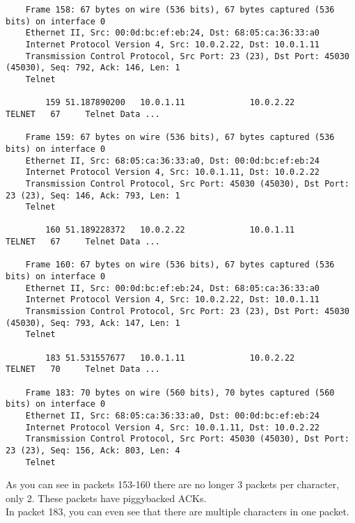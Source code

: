 \begin{verbatim}
	Frame 158: 67 bytes on wire (536 bits), 67 bytes captured (536 bits) on interface 0
	Ethernet II, Src: 00:0d:bc:ef:eb:24, Dst: 68:05:ca:36:33:a0
	Internet Protocol Version 4, Src: 10.0.2.22, Dst: 10.0.1.11
	Transmission Control Protocol, Src Port: 23 (23), Dst Port: 45030 (45030), Seq: 792, Ack: 146, Len: 1
	Telnet

		159 51.187890200   10.0.1.11             10.0.2.22             TELNET   67     Telnet Data ...

	Frame 159: 67 bytes on wire (536 bits), 67 bytes captured (536 bits) on interface 0
	Ethernet II, Src: 68:05:ca:36:33:a0, Dst: 00:0d:bc:ef:eb:24
	Internet Protocol Version 4, Src: 10.0.1.11, Dst: 10.0.2.22
	Transmission Control Protocol, Src Port: 45030 (45030), Dst Port: 23 (23), Seq: 146, Ack: 793, Len: 1
	Telnet

		160 51.189228372   10.0.2.22             10.0.1.11             TELNET   67     Telnet Data ...

	Frame 160: 67 bytes on wire (536 bits), 67 bytes captured (536 bits) on interface 0
	Ethernet II, Src: 00:0d:bc:ef:eb:24, Dst: 68:05:ca:36:33:a0
	Internet Protocol Version 4, Src: 10.0.2.22, Dst: 10.0.1.11
	Transmission Control Protocol, Src Port: 23 (23), Dst Port: 45030 (45030), Seq: 793, Ack: 147, Len: 1
	Telnet

		183 51.531557677   10.0.1.11             10.0.2.22             TELNET   70     Telnet Data ...

	Frame 183: 70 bytes on wire (560 bits), 70 bytes captured (560 bits) on interface 0
	Ethernet II, Src: 68:05:ca:36:33:a0, Dst: 00:0d:bc:ef:eb:24
	Internet Protocol Version 4, Src: 10.0.1.11, Dst: 10.0.2.22
	Transmission Control Protocol, Src Port: 45030 (45030), Dst Port: 23 (23), Seq: 156, Ack: 803, Len: 4
	Telnet
\end{verbatim}

As you can see in packets 153-160 there are no longer 3 packets per character, only 2. These packets have piggybacked ACKs. \\
In packet 183, you can even see that there are multiple characters in one packet.
